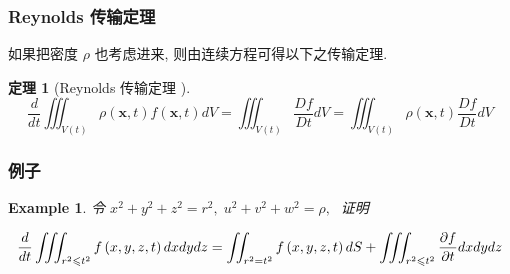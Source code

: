 \documentclass[aspectratio=2516]{beamer}
\newtheorem{thm}{\kaishu 定理}
\newtheorem{eg}{Example}
\begin{document}

\begin{frame}
\frametitle{\kaishu Reynolds 传输定理}
\kaishu


如果把密度 $ \rho $ 也考虑进来, 则由连续方程可得以下之传输定理.

\vspace{0.5cm}

\begin{thm}[\kaishu Reynolds 传输定理 \uppercase\expandafter{}]
	\begin{equation}
	\frac{d}{{dt}}\iiint_{V\left( t \right)} {\rho \left( {\boldsymbol{x},t} \right)f\left( {\boldsymbol{x},t} \right)dV} = \iiint_{V\left( t \right)} {\frac{{Df}}{{Dt}}dV} = \iiint_{V\left( t \right)} {\rho \left( {\boldsymbol{x},t} \right)\frac{{Df}}{{Dt}}dV}
	\label{eq5.2.6}
	\end{equation}
\end{thm}

\end{frame}


\begin{frame}
\frametitle{\kaishu 例子}
\kaishu

\begin{eg}
	
	\kaishu 
	
	\small 
	
	\text{}
	
	\vspace{0.15cm}
	
	令 ${x^2} + {y^2} + {z^2} = {r^2},\;{u^2} + {v^2} + {w^2} = \rho ,\;$ 证明
	
	\begin{equation}
	\tiny 
	\frac{d}{{dt}}\iiint_{{r^2} \leqslant {t^2}} {f\left( {x,y,z,t} \right)dxdydz} = \iint_{{r^2} = {t^2}} {f\left( {x,y,z,t} \right)dS} + \iiint_{{r^2} \leqslant {t^2}} {\frac{{\partial f}}{{\partial t}}dxdydz}
	\label{eq5.2.7}
	\end{equation}
\end{eg}

\end{frame}

\end{document}
